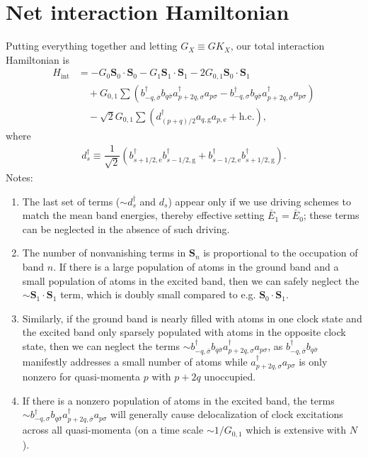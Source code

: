 \documentclass[aps,notitlepage,nofootinbib,11pt]{revtex4-1}
\renewcommand{\t}{\text} %
\newcommand{\f}[2]{\dfrac{#1}{#2}} %
\newcommand{\p}[1]{\left(#1\right)} %
\renewcommand{\v}{\bm} %
\renewcommand{\c}{\cdot} %
\newcommand{\1}{\mathds{1}}
\newcommand{\g}{\text{g}}
\newcommand{\e}{\text{e}}
\begin{document}
\section{Net interaction Hamiltonian}

Putting everything together and letting $G_X\equiv G K_X$, our total
interaction Hamiltonian is
\begin{align}
  H_{\t{int}}
  &= - G_0\v S_0\c\v S_0 - G_1\v S_1\c\v S_1 - 2 G_{0,1}\v S_0\c\v S_1
  \tag*{} \\ &\quad + G_{0,1} \sum
  \p{b_{-q,\bar\sigma}^\dag b_{q\bar\sigma} a_{p+2q,\sigma}^\dag a_{p\sigma}
    - b_{-q,\sigma}^\dag b_{q\bar\sigma} a_{p+2q,\bar\sigma}^\dag a_{p\sigma}}
  \tag*{} \\ &\quad - \sqrt2 G_{0,1} \sum
  \p{d_{\p{p+q}/2}^\dag a_{q,\g} a_{p,\e} + \t{h.c.}},
\end{align}
where
\begin{align}
  d_s^\dag \equiv \f1{\sqrt2}
  \p{b_{s+1/2,\e}^\dag b_{s-1/2,\g}^\dag
    + b_{s-1/2,\e}^\dag b_{s+1/2,\g}^\dag}.
\end{align}
Notes:
\begin{enumerate}[label=(\roman*)]
\item The last set of terms ($\sim d_s^\dag$ and $d_s$) appear only if
  we use driving schemes to match the mean band energies, thereby
  effective setting $\bar E_1=\bar E_0$; these terms can be neglected
  in the absence of such driving.
\item The number of nonvanishing terms in $\v S_n$ is proportional to
  the occupation of band $n$.  If there is a large population of atoms
  in the ground band and a small population of atoms in the excited
  band, then we can safely neglect the $\sim\v S_1\c\v S_1$ term,
  which is doubly small compared to e.g. $\v S_0\c\v S_1$.
\item Similarly, if the ground band is nearly filled with atoms in one
  clock state and the excited band only sparsely populated with atoms
  in the opposite clock state, then we can neglect the terms
  $\sim b_{-q,\bar\sigma}^\dag b_{q\bar\sigma} a_{p+2q,\sigma}^\dag
  a_{p\sigma}$, as $b_{-q,\bar\sigma}^\dag b_{q\bar\sigma}$ manifestly
  addresses a small number of atoms while
  $a_{p+2q,\sigma}^\dag a_{p\sigma}$ is only nonzero for quasi-momenta
  $p$ with $p+2q$ unoccupied.
\item If there is a nonzero population of atoms in the excited band,
  the terms
  $\sim b_{-q,\sigma}^\dag b_{q\bar\sigma} a_{p+2q,\bar\sigma}^\dag
  a_{p\sigma}$ will generally cause delocalization of clock
  excitations across all quasi-momenta (on a time scale
  $\sim1/G_{0,1}$ which is extensive with $N$).
\end{enumerate}
\end{document}
